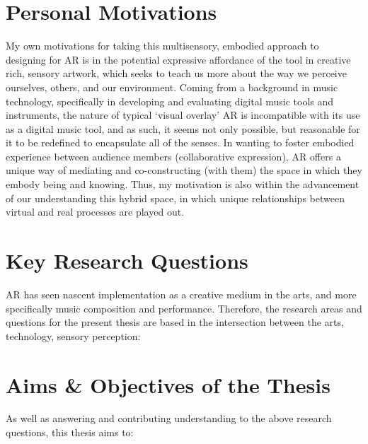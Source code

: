 \section{Personal Motivations}\label{sec: introduction-motivations}
My own motivations for taking this multisensory, embodied approach to designing for AR is in the potential expressive affordance of the tool in creative rich, sensory artwork, which seeks to teach us more about the way we perceive ourselves, others, and our environment. Coming from a background in music technology, specifically in developing and evaluating digital music tools and instruments, the nature of typical `visual overlay' AR is incompatible with its use as a digital music tool, and as such, it seems not only possible, but reasonable for it to be redefined to encapsulate all of the senses. In wanting to foster embodied experience between audience members (collaborative expression), AR offers a unique way of mediating and co-constructing (with them) the space in which they embody being and knowing. Thus, my motivation is also within the advancement of our understanding this hybrid space, in which unique relationships between virtual and real processes are played out.



\section{Key Research Questions}\label{sec: introduction-researchquestions}
AR has seen nascent implementation as a creative medium in the arts, and more specifically music composition and performance. Therefore, the research areas and questions for the present thesis are based in the intersection between the arts, technology, sensory perception:

\RQall

\section{Aims \& Objectives of the Thesis}\label{sec: introduction-aims}
As well as answering and contributing understanding to the above research questions, this thesis aims to:

